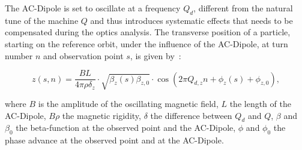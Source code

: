 The AC-Dipole is set to oscillate at a frequency $Q_d$, different from the natural tune of the
machine $Q$ and thus introduces systematic effects that needs to be compensated during the optics
analysis. The transverse position of a particle, starting on the reference orbit, under the
influence of the AC-Dipole, at turn number $n$ and observation point $s$, is given
by~\cite{serrano_lhc_2010,tomas_normal_2002,white_direct_2013}:

\begin{equation}
z(s, n) = \frac{BL}{4\pi\rho\delta_z} \cdot \sqrt{\beta_z(s) \beta_{z,0}} \cdot \cos \left( 2 \pi Q_{d,z}n + \phi_z(s) + \phi_{z,0}\right),
\label{eq:ac_dipole}
\end{equation}

where $B$ is the amplitude of the oscillating magnetic field, $L$ the length of the AC-Dipole,
$B\rho$ the magnetic rigidity, $\delta$ the difference between $Q_d$ and $Q$, $\beta$ and $\beta_0$
the beta-function at the observed point and the AC-Dipole, $\phi$ and $\phi_0$ the phase advance at
the observed point and at the AC-Dipole.
